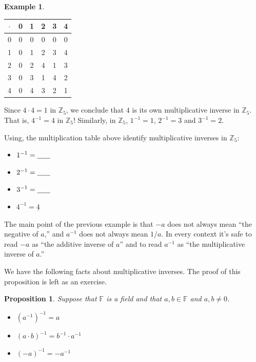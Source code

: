 \documentclass[11pt]{article}
\newenvironment{task}
	{\begin{mdframed}[linecolor=lightgray, linewidth=3pt]\raggedright}
	{\end{mdframed}}
\newtheorem{proposition}[theorem]{Proposition}
\theoremstyle{definition}
\newtheorem{example}[theorem]{Example}
\begin{document}
\begin{example}
  \begin{center}
    \begin{tabular}{|c|c|c|c|c|c|}\\ \hline
      $\cdot$ & 0 & 1 & 2 & 3 & 4 \\ \hline
      0       & 0 & 0 & 0 & 0 & 0 \\ \hline
      1       & 0 & 1 & 2 & 3 & 4 \\ \hline
      2       & 0 & 2 & 4 & 1 & 3 \\ \hline
      3       & 0 & 3 & 1 & 4 & 2 \\ \hline
      4       & 0 & 4 & 3 & 2 & 1 \\ \hline
    \end{tabular}
  \end{center}

  Since $4\cdot 4 = 1$ in $\mathbb{Z}_5$, we conclude that $4$ is its own multiplicative inverse in $\mathbb{Z}_5$. That is, $4^{-1}=4$ in $\mathbb{Z}_5$!
  Similarly, in $\mathbb{Z}_5$, $1^{-1}=1$, $2^{-1}=3$ and $3^{-1}=2$.

  \begin{task}
  Using, the multiplication table above identify multiplicative inverses in $\mathbb{Z}_5$: 
  \begin{itemize}
    \item $1^{-1} = \underline{\hspace{.25in}}$
    \item $2^{-1} = \underline{\hspace{.25in}}$
    \item $3^{-1} = \underline{\hspace{.25in}}$
    \item $4^{-1} = \underline{4}$
  \end{itemize}
  \end{task}

\end{example}

The main point of the previous example is that $-a$ does not always mean ``the negative of $a$,'' and $a^{-1}$ does not always mean $1/a$. In every context
it's safe to read $-a$ as ``the additive inverse of $a$'' and to read $a^{-1}$ as ``the multiplicative inverse of $a$.''

We have the following facts about multiplicative inverses. The proof of this proposition is left as an exercise.

\begin{proposition} Suppose that $\mathbb{F}$ is a field and that $a,b\in\mathbb{F}$ and $a,b\neq 0$.
  \begin{itemize}
    \item[(a)] $(a^{-1})^{-1} = a$
    \item[(b)] $(a\cdot b)^{-1}=b^{-1}\cdot a^{-1}$
    \item[(c)] $(-a)^{-1} = -a^{-1}$
  \end{itemize}\label{prop: multiplicative inverses}
\end{proposition}
\end{document}
